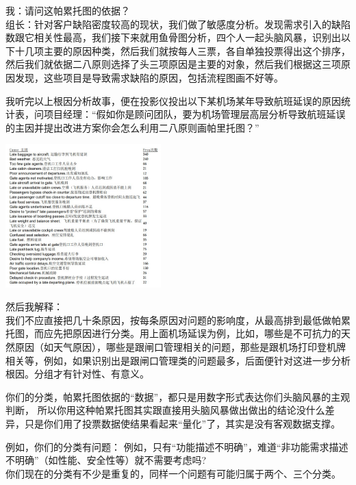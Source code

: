 我：请问这帕累托图的依据？\\
组长：针对客户缺陷密度较高的现状，我们做了敏感度分析。发现需求引入的缺陷数跟它相关性最高，我们接下来就用鱼骨图分析，四个人一起头脑风暴，识别出以下十几项主要的原因种类，然后我们就按每人三票，各自单独投票得出这个排序，然后我们就依据二八原则选择了头三项原因是主要的对象，然后我们根据这三项原因发现，这些项目是导致需求缺陷的原因，包括流程图画不好等。

我听完以上根因分析故事，便在投影仪投出以下某机场某年导致航班延误的原因统计表，问项目经理：``假如你是顾问团队，要为机场管理层高层分析导致航班延误的主因并提出改进方案你会怎么利用二八原则画帕里托图？''

\begin{description}
\item[]
\end{description}

\includegraphics[width=6cm]{CRairportDelayScreenshot_2023-06-02_191306.jpg}


然后我解释：\\
我们不应直接把几十条原因，按每条原因对问题的影响度，从最高排到最低做帕累托图，而应先把原因进行分类。用上面机场延误为例，比如，哪些是不可抗力的天然原因（如天气原因），哪些是跟闸口管理相关的问题，那些是跟机场打印登机牌相关等，例如，如果识别出是跟闸口管理类的问题最多，后面便针对这进一步分析根因。分组才有针对性、有意义。

你们的分类，帕累托图依据的``数据''，都只是用数字形式表达你们头脑风暴的主观判断，
所以你用这种帕累托图其实跟直接用头脑风暴做出做出的结论没什么差异，只是你们用了投票数据使结果看起来``量化''了，其实是没有客观数据支撑。

例如，你们的分类有问题：
例如，只有``功能描述不明确''，难道``非功能需求描述不明确''（如性能、安全性等）就不需要考虑吗?\\
你们现在的分类有不少是重复的，同样一个问题有可能归属于两个、三个分类。

